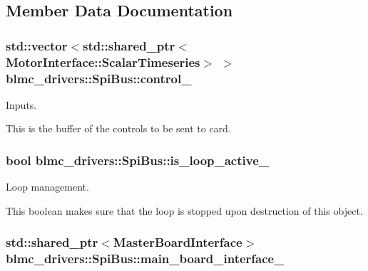 \subsection{Member Data Documentation}
\subsubsection[{\texorpdfstring{control\+\_\+}{control_}}]{\setlength{\rightskip}{0pt plus 5cm}std\+::vector$<$std\+::shared\+\_\+ptr$<${\bf Motor\+Interface\+::\+Scalar\+Timeseries}$>$ $>$ blmc\+\_\+drivers\+::\+Spi\+Bus\+::control\+\_\+\hspace{0.3cm}{\ttfamily [private]}}\hypertarget{classblmc__drivers_1_1SpiBus_a39d0629b2cb78b7aeae9a4022ca487ed}{}\label{classblmc__drivers_1_1SpiBus_a39d0629b2cb78b7aeae9a4022ca487ed}


Inputs. 

This is the buffer of the controls to be sent to card. 
\subsubsection[{\texorpdfstring{is\+\_\+loop\+\_\+active\+\_\+}{is_loop_active_}}]{\setlength{\rightskip}{0pt plus 5cm}bool blmc\+\_\+drivers\+::\+Spi\+Bus\+::is\+\_\+loop\+\_\+active\+\_\+\hspace{0.3cm}{\ttfamily [private]}}\hypertarget{classblmc__drivers_1_1SpiBus_acf6f61ce04098f05fd04971b477da07c}{}\label{classblmc__drivers_1_1SpiBus_acf6f61ce04098f05fd04971b477da07c}


Loop management. 

This boolean makes sure that the loop is stopped upon destruction of this object. 
\subsubsection[{\texorpdfstring{main\+\_\+board\+\_\+interface\+\_\+}{main_board_interface_}}]{\setlength{\rightskip}{0pt plus 5cm}std\+::shared\+\_\+ptr$<$Master\+Board\+Interface$>$ blmc\+\_\+drivers\+::\+Spi\+Bus\+::main\+\_\+board\+\_\+interface\+\_\+\hspace{0.3cm}{\ttfamily [private]}}\hypertarget{classblmc__drivers_1_1SpiBus_aa5505729650a363fc5ea2d03c27f0b90}{}\label{classblmc__drivers_1_1SpiBus_aa5505729650a363fc5ea2d03c27f0b90}


